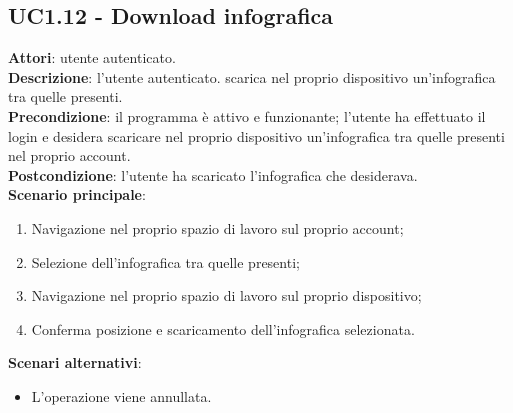 \subsection{UC1.12 - Download infografica}{
	\label{uc1.12}
	\textbf{Attori}: utente autenticato.\\
	\textbf{Descrizione}: l'utente autenticato. scarica nel proprio dispositivo un'infografica tra quelle presenti.\\
	\textbf{Precondizione}: il programma è attivo e funzionante; l'utente ha effettuato il login e desidera scaricare nel proprio dispositivo un'infografica tra quelle presenti nel proprio account.	\\
	\textbf{Postcondizione}: l'utente ha scaricato l'infografica che desiderava.\\
	\textbf{Scenario principale}:
	\begin{enumerate}
		\item Navigazione nel proprio spazio di lavoro sul proprio account;
		\item Selezione dell'infografica tra quelle presenti;
		\item Navigazione nel proprio spazio di lavoro sul proprio dispositivo;
		\item Conferma posizione e scaricamento dell'infografica selezionata.
		\end{enumerate}	
	\textbf{Scenari alternativi}:
	\begin{itemize}
		\item L'operazione viene annullata.
	\end{itemize}
	}